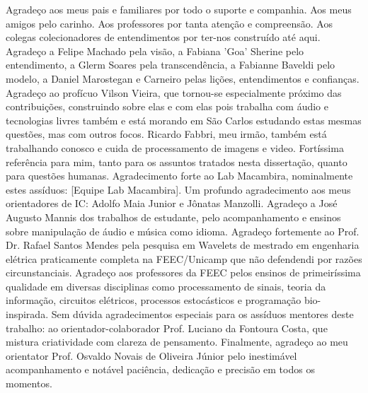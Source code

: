     Agradeço aos meus pais e familiares por todo o suporte e companhia. Aos
meus amigos pelo carinho. Aos professores por tanta atenção e compreensão.
Aos colegas colecionadores de entendimentos por ter-nos construído até aqui.
Agradeço a Felipe Machado pela visão, a Fabiana 'Goa' Sherine pelo entendimento,
a Glerm Soares pela transcendência, a Fabianne Baveldi pelo modelo, a Daniel
Marostegan e Carneiro pelas lições, entendimentos e confianças. Agradeço ao profícuo Vilson Vieira, que tornou-se especialmente próximo
das contribuições, construindo sobre elas e com elas pois trabalha com áudio e tecnologias livres também
e está morando em São Carlos estudando estas mesmas questões, mas com outros focos. Ricardo Fabbri, meu irmão,
também está trabalhando conosco e cuida de processamento de imagens e video. Fortíssima referência
para mim, tanto para os assuntos tratados nesta dissertação, quanto para questões humanas. Agradecimento
forte ao Lab Macambira, nominalmente estes assíduos: [Equipe Lab Macambira]. Um profundo agradecimento
aos meus orientadores de IC: Adolfo Maia Junior e Jônatas Manzolli. Agradeço a José Augusto Mannis
dos trabalhos de estudante, pelo acompanhamento e ensinos sobre manipulação de áudio e música como idioma.
Agradeço fortemente ao Prof. Dr. Rafael Santos Mendes pela pesquisa em Wavelets de mestrado em engenharia elétrica
praticamente completa na FEEC/Unicamp que não defendendi por razões circunstanciais. Agradeço aos professores da FEEC pelos ensinos de
primeiríssima qualidade em diversas disciplinas como processamento de sinais, teoria da informação, 
circuitos elétricos, processos estocásticos
e programação bio-inspirada. Sem dúvida agradecimentos especiais para os assíduos mentores
deste trabalho: ao orientador-colaborador Prof. Luciano da Fontoura Costa, que
mistura criatividade com clareza de pensamento. Finalmente, agradeço ao meu 
orientator Prof. Osvaldo Novais de Oliveira Júnior pelo inestimável acompanhamento
e notável paciência, dedicação e precisão em todos os momentos.
